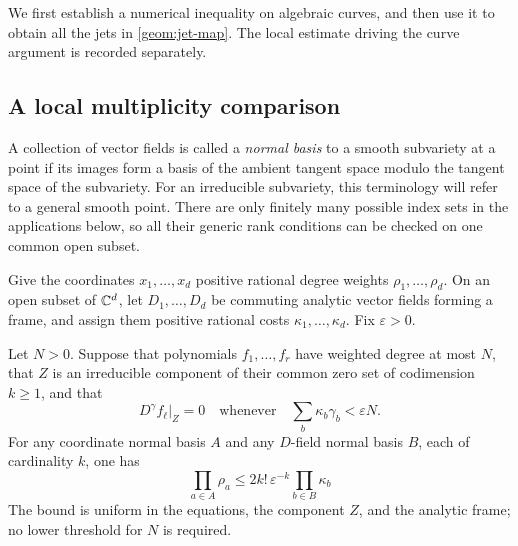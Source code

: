 We first establish a numerical inequality on algebraic curves, and then use
it to obtain all the jets in \eqref{geom:jet-map}. The local estimate driving
the curve argument is recorded separately.

\subsection{A local multiplicity comparison}

A collection of vector fields is called a \emph{normal basis} to a smooth
subvariety at a point if its images form a basis of the ambient tangent space
modulo the tangent space of the subvariety. For an irreducible subvariety,
this terminology will refer to a general smooth point. There are only
finitely many possible index sets in the applications below, so all their
generic rank conditions can be checked on one common open subset.

\begin{lemma}
\label{geom:multiplicity}
Give the coordinates $x_1,\ldots,x_d$ positive rational degree weights
$\rho_1,\ldots,\rho_d$. On an open subset of $\mathbb C^d$, let
$D_1,\ldots,D_d$ be commuting analytic vector fields forming a frame, and
assign them positive rational costs $\kappa_1,\ldots,\kappa_d$. Fix
$\varepsilon>0$.

Let $N>0$. Suppose that polynomials $f_1,\ldots,f_r$ have weighted degree at most $N$,
that $Z$ is an irreducible component of their common zero set of codimension
$k\ge1$, and that
\begin{equation}
\label{geom:persistent-derivatives}
 D^\gamma f_\ell\big|_Z=0
 \quad\text{whenever}\quad
 \sum_b\kappa_b\gamma_b<\varepsilon N.
\end{equation}
For any coordinate normal basis $A$ and any $D$-field normal basis $B$,
each of cardinality $k$, one has
\begin{equation}
\label{geom:multiplicity-comparison}
 \prod_{a\in A}\rho_a
 \le 2k!\,\varepsilon^{-k}\prod_{b\in B}\kappa_b
\end{equation}
The bound is uniform in the equations, the component $Z$, and the
analytic frame; no lower threshold for $N$ is required.
\end{lemma}

